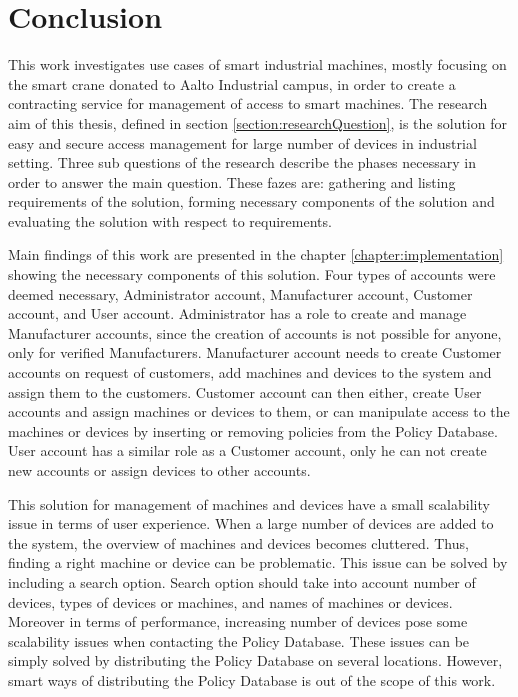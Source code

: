\chapter{Conclusion}
\label{chapter:conclusion}

This work investigates use cases of smart industrial machines, mostly focusing on the smart crane donated to Aalto Industrial campus, in order to create a contracting service for management of access to smart machines. The research aim of this thesis, defined in section \ref{section:researchQuestion}, is the solution for easy and secure access management for large number of devices in industrial setting. Three sub questions of the research describe the phases necessary in order to answer the main question. These fazes are: gathering and listing requirements of the solution, forming necessary components of the solution and evaluating the solution with respect to requirements. 

Main findings of this work are presented in the chapter \ref{chapter:implementation} showing the necessary components of this solution. Four types of accounts were deemed necessary, Administrator account, Manufacturer account, Customer account, and User account. Administrator has a role to create and manage Manufacturer accounts, since the creation of accounts is not possible for anyone, only for verified Manufacturers. Manufacturer account needs to create Customer accounts on request of customers, add machines and devices to the system and assign them to the customers. Customer account can then either, create User accounts and assign machines or devices to them, or can manipulate access to the machines or devices by inserting or removing policies from the Policy Database. User account has a similar role as a Customer account, only he can not create new accounts or assign devices to other accounts. 

This solution for management of machines and devices have a small scalability issue in terms of user experience. When a large number of devices are added to the system, the overview of machines and devices becomes cluttered. Thus, finding a right machine or device can be problematic. This issue can be solved by including a search option. Search option should take into account number of devices, types of devices or machines, and names of machines or devices. Moreover in terms of performance, increasing number of devices pose some scalability issues when contacting the Policy Database. These issues can be simply solved by distributing the Policy Database on several locations. However, smart ways of distributing the Policy Database is out of the scope of this work.

